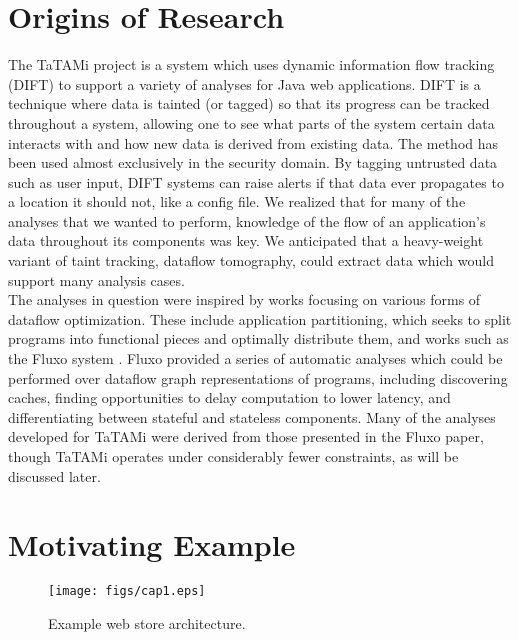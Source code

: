 \documentclass[msc,oneside]{ubcthesis}
\begin{document}
	
\section{Origins of Research}
		
The TaTAMi project is a system which uses dynamic information flow tracking (DIFT) to support a variety of analyses for Java web applications.  DIFT is a technique where data is tainted (or tagged) so that its progress can be tracked throughout a system, allowing one to see what parts of the system certain data interacts with and how new data is derived from existing data. The method has been used almost exclusively in the security domain. By tagging untrusted data such as user input, DIFT systems can raise alerts if that data ever propagates to a location it should not, like a config file. We realized that for many of the analyses that we wanted to perform, knowledge of the flow of an application's data throughout its components was key. We anticipated that a heavy-weight variant of taint tracking, dataflow tomography, could extract data which would support many analysis cases.\\

The analyses in question were inspired by works focusing on various forms of dataflow optimization. These include application partitioning, which seeks to split programs into functional pieces and optimally distribute them, and works such as the Fluxo system \cite{Kiciman2010}. Fluxo provided a series of automatic analyses which could be performed over dataflow graph representations of programs, including discovering caches, finding opportunities to delay computation to lower latency, and differentiating between stateful and stateless components. Many of the analyses developed for TaTAMi were derived from those presented in the Fluxo paper, though TaTAMi operates under considerably fewer constraints, as will be discussed later.	
	
\section{Motivating Example}

\begin{figure}[ht]
  \begin{center}
    \texttt{[image: figs/cap1.eps]}
    \caption[Example web store architecture.]{\label{fig:cap1} Example web store architecture.}
  \end{center}
\end{figure}
\end{document}
